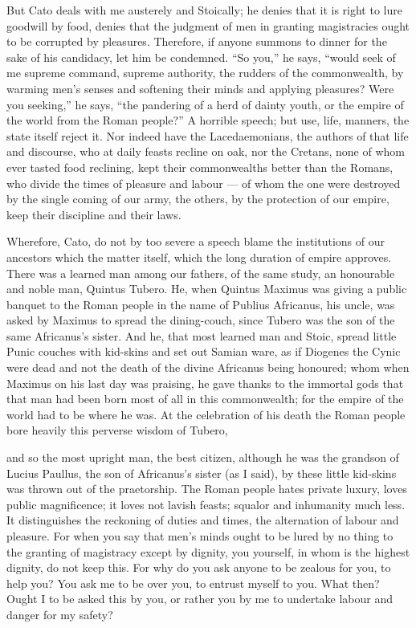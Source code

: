 But Cato deals with me austerely and Stoically; he denies that it is right to lure goodwill by food, denies that the judgment of men in granting magistracies ought to be corrupted by pleasures. Therefore, if anyone summons to dinner for the sake of his candidacy, let him be condemned. ``So you,'' he says, ``would seek of me supreme command, supreme authority, the rudders of the commonwealth, by warming men's senses and softening their minds and applying pleasures? Were you seeking,'' he says, ``the pandering of a herd of dainty youth, or the empire of the world from the Roman people?'' A horrible speech; but use, life, manners, the state itself reject it. Nor indeed have the Lacedaemonians, the authors of that life and discourse, who at daily feasts recline on oak, nor the Cretans, none of whom ever tasted food reclining, kept their commonwealths better than the Romans, who divide the times of pleasure and labour --- of whom the one were destroyed by the single coming of our army, the others, by the protection of our empire, keep their discipline and their laws.

 Wherefore, Cato, do not by too severe a speech blame the institutions of our ancestors which the matter itself, which the long duration of empire approves. There was a learned man among our fathers, of the same study, an honourable and noble man, Quintus Tubero. He, when Quintus Maximus was giving a public banquet to the Roman people in the name of Publius Africanus, his uncle, was asked by Maximus to spread the dining-couch, since Tubero was the son of the same Africanus's sister. And he, that most learned man and Stoic, spread little Punic couches with kid-skins and set out Samian ware, as if Diogenes the Cynic were dead and not the death of the divine Africanus being honoured; whom when Maximus on his last day was praising, he gave thanks to the immortal gods that that man had been born most of all in this commonwealth; for the empire of the world had to be where he was. At the celebration of his death the Roman people bore heavily this perverse wisdom of Tubero,

 and so the most upright man, the best citizen, although he was the grandson of Lucius Paullus, the son of Africanus's sister (as I said), by these little kid-skins was thrown out of the praetorship. The Roman people hates private luxury, loves public magnificence; it loves not lavish feasts; squalor and inhumanity much less. It distinguishes the reckoning of duties and times, the alternation of labour and pleasure. For when you say that men's minds ought to be lured by no thing to the granting of magistracy except by dignity, you yourself, in whom is the highest dignity, do not keep this. For why do you ask anyone to be zealous for you, to help you? You ask me to be over you, to entrust myself to you. What then? Ought I to be asked this by you, or rather you by me to undertake labour and danger for my safety?

